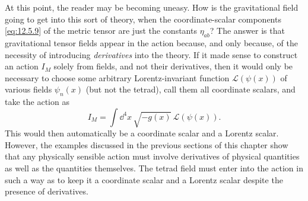 At this point, the reader may be becoming uneasy. How is the gravitational
field going to get into this sort of theory, when the coordinate-scalar
components \eqref{eq:12.5.9} of the metric tensor are just the constants
\(\eta_{ab}\)? The answer is that gravitational tensor fields appear in the
action because, and only because, of the necessity of introducing
\emph{derivatives} into the theory. If it made sense to construct an action
\(I_M\) solely from fields, and not their derivatives, then it would only be
necessary to choose some arbitrary Lorentz-invariant function
\(\mathcal L(\psi(x))\) of various fields \(\psi_n(x)\) (but not the tetrad),
call them all coordinate scalars, and take the action as
\[
  I_M
  =
  \int\dd^4x\,\sqrt{-g(x)}\,\mathcal L(\psi(x)).
\]
This would then automatically be a coordinate scalar and a Lorentz scalar.
However, the examples discussed in the previous sections of this chapter
show that any physically sensible action must involve derivatives of physical
quantities as well as the quantities themselves. The tetrad field must enter
into the action in such a way as to keep it a coordinate scalar and a Lorentz
scalar despite the presence of derivatives.

